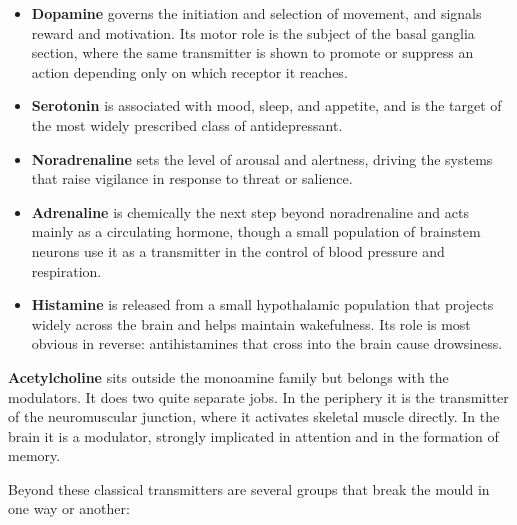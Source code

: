 \documentclass[11pt]{article}
\begin{document}
\begin{itemize}
    \item \textbf{Dopamine} governs the initiation and selection of movement, and signals reward and motivation. Its motor role is the subject of the basal ganglia section, where the same transmitter is shown to promote or suppress an action depending only on which receptor it reaches.
    \item \textbf{Serotonin} is associated with mood, sleep, and appetite, and is the target of the most widely prescribed class of antidepressant.
    \item \textbf{Noradrenaline} sets the level of arousal and alertness, driving the systems that raise vigilance in response to threat or salience.
    \item \textbf{Adrenaline} is chemically the next step beyond noradrenaline and acts mainly as a circulating hormone, though a small population of brainstem neurons use it as a transmitter in the control of blood pressure and respiration.
    \item \textbf{Histamine} is released from a small hypothalamic population that projects widely across the brain and helps maintain wakefulness. Its role is most obvious in reverse: antihistamines that cross into the brain cause drowsiness.
\end{itemize}

\textbf{Acetylcholine} sits outside the monoamine family but belongs with the modulators. It does two quite separate jobs. In the periphery it is the transmitter of the neuromuscular junction, where it activates skeletal muscle directly. In the brain it is a modulator, strongly implicated in attention and in the formation of memory.

Beyond these classical transmitters are several groups that break the mould in one way or another:
\end{document}
